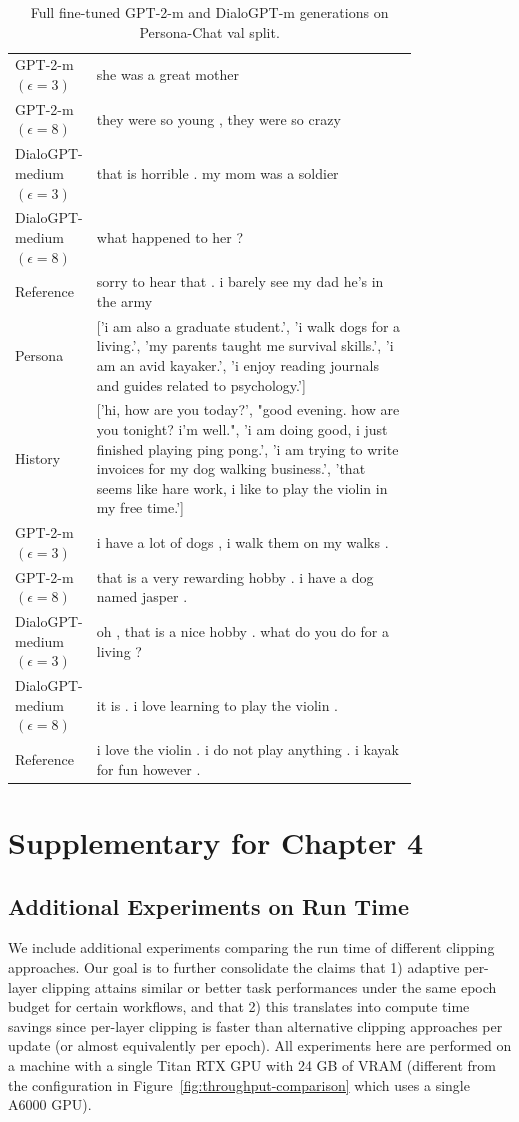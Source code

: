 \begin{table}[h]
\begin{tabular}{l | p{0.8\linewidth}}
 \hline
GPT-2-m $(\epsilon=3)$ & she was a great mother \\
GPT-2-m $(\epsilon=8)$ & they were so young , they were so crazy \\
DialoGPT-medium $(\epsilon=3)$ & that is horrible . my mom was a soldier \\
DialoGPT-medium $(\epsilon=8)$ & what happened to her ? \\
\hline
 Reference & sorry to hear that . i barely see my dad he's in the army \\
\midrule\midrule
Persona & ['i am also a graduate student.', 'i walk dogs for a living.', 'my parents taught me survival skills.', 'i am an avid kayaker.', 'i enjoy reading journals and guides related to psychology.'] \\
 \hline
History & ['hi, how are you today?', "good evening. how are you tonight? i'm well.", 'i am doing good, i just finished playing ping pong.', 'i am trying to write invoices for my dog walking business.', 'that seems like hare work, i like to play the violin in my free time.'] \\
 \hline
GPT-2-m $(\epsilon=3)$ & i have a lot of dogs , i walk them on my walks . \\
GPT-2-m $(\epsilon=8)$ & that is a very rewarding hobby . i have a dog named jasper . \\
DialoGPT-medium $(\epsilon=3)$ & oh , that is a nice hobby . what do you do for a living ? \\
DialoGPT-medium $(\epsilon=8)$ & it is . i love learning to play the violin . \\
\hline
 Reference & i love the violin . i do not play anything . i kayak for fun however . \\
\bottomrule
\end{tabular}
\caption{\small Full fine-tuned GPT-2-m and DialoGPT-m generations on Persona-Chat val split.}
\end{table}

\clearpage
\newpage
\section{Supplementary for Chapter 4}


\subsection{Additional Experiments on Run Time}
\label{app:runtime}

We include additional experiments comparing the run time of different clipping approaches.
Our goal is to further consolidate the claims that 1) adaptive per-layer clipping attains similar or better task performances under the same epoch budget for certain workflows, and that 2) this translates into compute time savings since per-layer clipping is faster than alternative clipping approaches per update (or almost equivalently per epoch).
All experiments here are performed on a machine with a single Titan RTX GPU with 24 GB of VRAM (different from the configuration in Figure~\ref{fig:throughput-comparison} which uses a single A6000 GPU).

